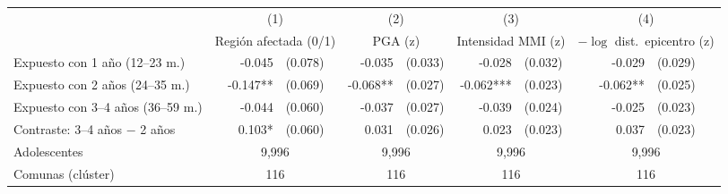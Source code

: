 \begin{tabular}{l rl rl rl rl}
\toprule
 & \multicolumn{2}{c}{(1)} & \multicolumn{2}{c}{(2)} & \multicolumn{2}{c}{(3)} & \multicolumn{2}{c}{(4)} \\
 & \multicolumn{2}{c}{Regi\'on afectada (0/1)} & \multicolumn{2}{c}{PGA (z)} & \multicolumn{2}{c}{Intensidad MMI (z)} & \multicolumn{2}{c}{$-\log$ dist.\ epicentro (z)} \\
\midrule
Expuesto con 1 a\~no (12--23 m.) & -0.045 & (0.078) & -0.035 & (0.033) & -0.028 & (0.032) & -0.029 & (0.029) \\
Expuesto con 2 a\~nos (24--35 m.) & -0.147** & (0.069) & -0.068** & (0.027) & -0.062*** & (0.023) & -0.062** & (0.025) \\
Expuesto con 3--4 a\~nos (36--59 m.) & -0.044 & (0.060) & -0.037 & (0.027) & -0.039 & (0.024) & -0.025 & (0.023) \\
\addlinespace
Contraste: 3--4 a\~nos $-$ 2 a\~nos & 0.103* & (0.060) & 0.031 & (0.026) & 0.023 & (0.023) & 0.037 & (0.023) \\
\midrule
Adolescentes & \multicolumn{2}{c}{9,996} & \multicolumn{2}{c}{9,996} & \multicolumn{2}{c}{9,996} & \multicolumn{2}{c}{9,996} \\
Comunas (cl\'uster) & \multicolumn{2}{c}{116} & \multicolumn{2}{c}{116} & \multicolumn{2}{c}{116} & \multicolumn{2}{c}{116} \\
\bottomrule
\end{tabular}
